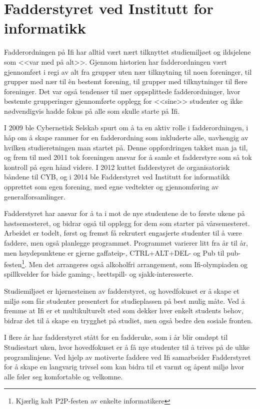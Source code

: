 \chapter{Fadderstyret ved Institutt for informatikk}

\author{Skrevet av Thao Tran, leder for Fadderstyret ved Institutt for informatikk, og Arne Hassel}

Fadderordningen på Ifi har alltid vært nært tilknyttet studiemiljøet og ildsjelene som <<var med på alt>>. Gjennom historien har fadderordningen vært gjennomført i regi av alt fra grupper uten nær tilknytning til noen foreninger, til grupper med nær til èn bestemt forening, til grupper med tilknytninger til flere foreninger. Det var også tendenser til mer oppsplittede fadderordninger, hvor bestemte grupperinger gjennomførte opplegg for <<sine>> studenter og ikke nødvendigvis hadde fokus på alle som skulle starte på Ifi.

I 2009 ble Cybernetisk Selskab spurt om å ta en aktiv rolle i fadderordningen, i håp om å skape rammer for en fadderordning som inkluderte alle, uavhengig av hvilken studieretningen man startet på. Denne oppfordringen takket man ja til, og frem til med 2011 tok foreningen ansvar for å samle et fadderstyre som så tok kontroll på egen hånd videre. I 2012 kuttet fadderstyret de organisatorisk båndene til CYB, og i 2014 ble Fadderstyret ved Institutt for informatikk opprettet som egen forening, med egne vedtekter og gjennomføring av generalforsamlinger.

Fadderstyret har ansvar for å ta i mot de nye studentene de to første ukene på høstsemesteret, og bidrar også til opplegg for dem som starter på vårsemesteret. Arbeidet er todelt, først og fremst få rekrutert engasjerte studenter til å være faddere, men også planlegge programmet. Programmet varierer litt fra år til år, men høydepunktene er gjerne gaffateip-, CTRL+ALT+DEL- og Pub til pub-festen\footnote{Kjærlig kalt P2P-festen av enkelte informatikere}. Men det arrangeres også alkoholfri arrangement, som Ifi-olympiaden og spillkvelder for både gaming-, brettspill- og sjakk-interesserte.

Studiemiljøet er hjørnesteinen av fadderstyret, og hovedfokuset er å skape et miljø som får studenter presentert for studieplassen på best mulig måte. Ved å fremme at Ifi er et multikulturelt sted som dekker hver enkelt students behov, bidrar det til å skape en trygghet på studiet, men også bedre den sosiale fronten.

I flere år har fadderstyret stått for en fadderuke, som i år blir omdøpt til Studiestart uken, hvor hovedfokuset er å få nye studenter til å trives på de ulike programlinjene. Ved hjelp av motiverte faddere ved Ifi samarbeider Fadderstyret for å skape en langvarig trivsel som kan bidra til et varmt og åpent miljø hvor alle føler seg komfortable og velkomne.
